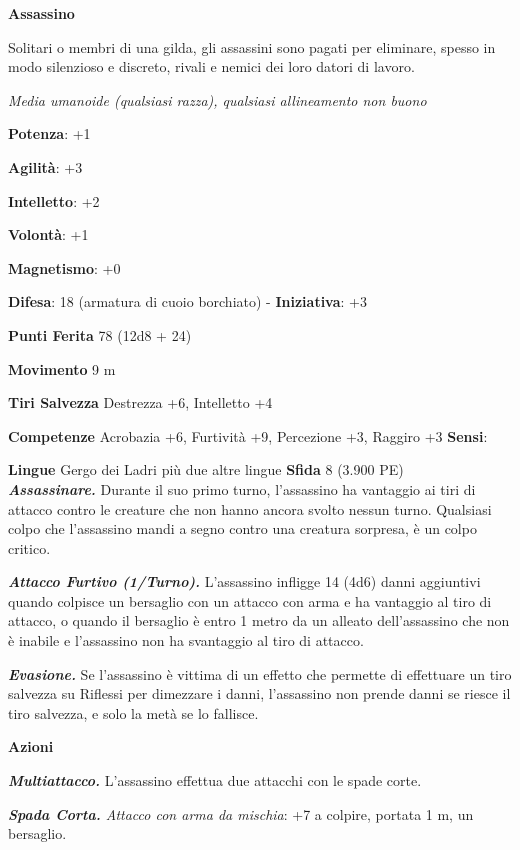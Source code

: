 \begin{multicols}{2}
\textbf{Assassino}

Solitari o membri di una gilda, gli assassini sono pagati per eliminare,
spesso in modo silenzioso e discreto, rivali e nemici dei loro datori di
lavoro.

\emph{Media umanoide (qualsiasi razza), qualsiasi allineamento non
buono}

\textbf{Potenza}: +1

\textbf{Agilità}: +3

\textbf{Intelletto}: +2

\textbf{Volontà}: +1

\textbf{Magnetismo}: +0

\textbf{Difesa}: 18 (armatura di cuoio borchiato) - \textbf{Iniziativa}: +3

\textbf{Punti Ferita} 78 (12d8 + 24)

\textbf{Movimento} 9 m

\textbf{Tiri Salvezza} Destrezza +6, Intelletto +4

\textbf{Competenze} Acrobazia +6, Furtività +9, Percezione +3, Raggiro +3
\textbf{Sensi}: 

\textbf{Lingue} Gergo dei Ladri più due altre lingue \textbf{Sfida} 8
(3.900 PE)\smallskip\\

\emph{\textbf{Assassinare.}} Durante il suo primo turno, l'assassino ha
vantaggio ai tiri di attacco contro le creature che non hanno ancora
svolto nessun turno. Qualsiasi colpo che l'assassino mandi a segno
contro una creatura sorpresa, è un colpo critico.

\emph{\textbf{Attacco Furtivo (1/Turno).}} L'assassino infligge 14 (4d6)
danni aggiuntivi quando colpisce un bersaglio con un attacco con arma e
ha vantaggio al tiro di attacco, o quando il bersaglio è entro 1 metro
da un alleato dell'assassino che non è inabile e l'assassino non ha
svantaggio al tiro di attacco.

\emph{\textbf{Evasione.}} Se l'assassino è vittima di un effetto che
permette di effettuare un tiro salvezza su Riflessi per dimezzare i
danni, l'assassino non prende danni se riesce il tiro salvezza, e solo
la metà se lo fallisce.

\smallskip\textbf{Azioni}

\emph{\textbf{Multiattacco.}} L'assassino effettua due attacchi con le
spade corte.

\emph{\textbf{Spada Corta.} Attacco con arma da mischia}: +7 a colpire,
portata 1 m, un bersaglio.


\end{multicols}
